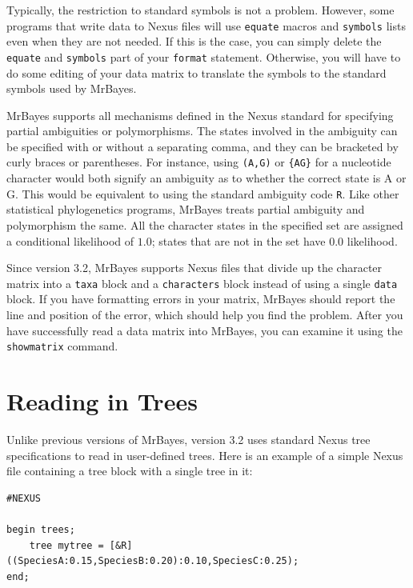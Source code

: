 \documentclass[12pt]{book}
\newcommand{\ttt}[1]{\texttt{#1}}
\begin{document}
Typically, the restriction to standard symbols is not a problem. However, some programs that write
data to Nexus files will use \ttt{equate} macros and \ttt{symbols} lists even when they are not
needed. If this is the case, you can simply delete the \ttt{equate} and \ttt{symbols} part of your
\ttt{format} statement. Otherwise, you will have to do some editing of your data matrix to
translate the symbols to the standard symbols used by MrBayes.

MrBayes supports all mechanisms defined in the Nexus standard for specifying partial ambiguities or
polymorphisms. The states involved in the ambiguity can be specified with or without a separating
comma, and they can be bracketed by curly braces or parentheses. For instance, using \ttt{(A,G)} or
\ttt{\{AG\}} for a nucleotide character would both signify an ambiguity as to whether the correct
state is A or G. This would be equivalent to using the standard ambiguity code \ttt{R}. Like other
statistical phylogenetics programs, MrBayes treats partial ambiguity and polymorphism the same. All
the character states in the specified set are assigned a conditional likelihood of $1.0$; states
that are not in the set have $0.0$ likelihood.

Since version 3.2, MrBayes supports Nexus files that divide up the character matrix into a
\ttt{taxa} block and a \ttt{characters} block instead of using a single \ttt{data} block. If you
have formatting errors in your matrix, MrBayes should report the line and position of the error,
which should help you find the problem. After you have successfully read a data matrix into
MrBayes, you can examine it using the \ttt{showmatrix} command.

\section{Reading in Trees}
Unlike previous versions of MrBayes, version 3.2 uses standard Nexus tree specifications to read in
user-defined trees. Here is an example of a simple Nexus file containing a tree block with a single
tree in it:

\footnotesize
\begin{singlespacing}
\begin{verbatim}
#NEXUS

begin trees;
    tree mytree = [&R] ((SpeciesA:0.15,SpeciesB:0.20):0.10,SpeciesC:0.25);
end;
\end{verbatim}
\end{singlespacing}
\normalsize
\end{document}
